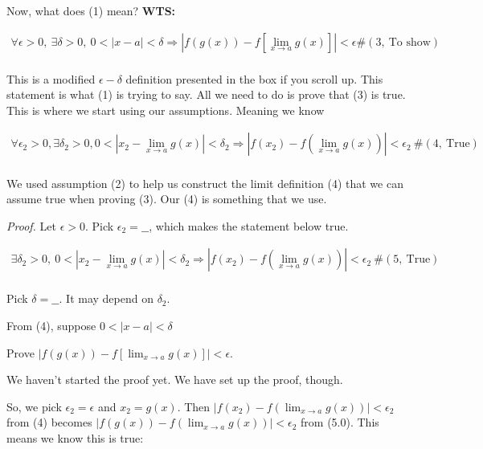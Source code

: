 \documentclass[
]{article}
\begin{document}
Now, what does (1) mean? \textbf{WTS:}

$$\begin{matrix}
\forall\epsilon > 0,\ \exists\delta > 0,\ 0 < |x - a| < \delta \Rightarrow \left| f\left( g(x) \right) - f\left\lbrack \lim_{x \rightarrow a}{g(x)} \right\rbrack \right| < \epsilon\#\left( 3,\ \text{To\ show} \right) \\
\end{matrix}$$

This is a modified $\epsilon - \delta$ definition presented in the box
if you scroll up. This statement is what (1) is trying to say. All we
need to do is prove that (3) is true. This is where we start using our
assumptions. Meaning we know

$$\begin{matrix}
\forall\epsilon_{2} > 0,\exists\delta_{2} > 0,0 < \left| x_{2} - \lim_{x \rightarrow a}{g(x)} \right| < \delta_{2} \Rightarrow \left| f\left( x_{2} \right) - f\left( \lim_{x \rightarrow a}{g(x)} \right) \right| < \epsilon_{2}\ \#\left( 4,\ \text{True} \right) \\
\end{matrix}$$

We used assumption (2) to help us construct the limit definition (4)
that we can assume true when proving (3). Our (4) is something that we
use.

\emph{Proof.} Let $\epsilon > 0$. Pick $\epsilon_{2} = \_\_$, which
makes the statement below true.

$$\begin{matrix}
\exists\delta_{2} > 0,\ 0 < \left| x_{2} - \lim_{x \rightarrow a}{g(x)} \right| < \delta_{2} \Rightarrow \left| f\left( x_{2} \right) - f\left( \lim_{x \rightarrow a}{g(x)} \right) \right| < \epsilon_{2}\ \#\left( 5,\ \text{True} \right) \\
\end{matrix}$$

Pick $\delta = \_\_$. It may depend on $\delta_{2}$.

From (4), suppose $0 < |x - a| < \delta$

Prove
$\left| f\left( g(x) \right) - f\left\lbrack \lim_{x \rightarrow a}{g(x)} \right\rbrack \right| < \epsilon$.

We haven't started the proof yet. We have set up the proof, though.

So, we pick $\epsilon_{2} = \epsilon$ and $x_{2} = g(x)$. Then
$\left| f\left( x_{2} \right) - f\left( \lim_{x \rightarrow a}{g(x)} \right) \right| < \epsilon_{2}$
from (4) becomes
$\left| f\left( g(x) \right) - f\left( \lim_{x \rightarrow a}{g(x)} \right) \right| < \epsilon_{2}$
from (5.0). This means we know this is true:
\end{document}
